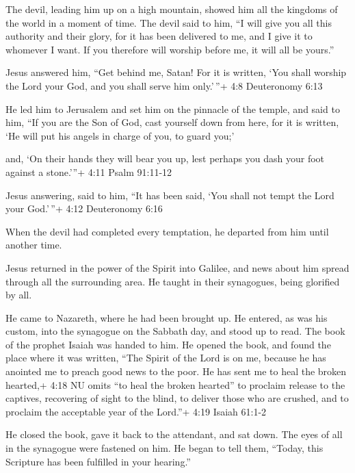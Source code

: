  The devil, leading him up on a high mountain, showed him
all the kingdoms of the world in a moment of time.  The
devil said to him, ``I will give you all this authority and their glory,
for it has been delivered to me, and I give it to whomever I want.
 If you therefore will worship before me, it will all be
yours.''

 Jesus answered him, ``Get behind me, Satan! For it is
written, `You shall worship the Lord your God, and you shall serve him
only.'\,''+ 4:8 Deuteronomy 6:13

 He led him to Jerusalem and set him on the pinnacle of the
temple, and said to him, ``If you are the Son of God, cast yourself down
from here,  for it is written, `He will put his angels in
charge of you, to guard you;'

 and, `On their hands they will bear you up, lest perhaps
you dash your foot against a stone.'''+ 4:11 Psalm 91:11-12

 Jesus answering, said to him, ``It has been said, `You
shall not tempt the Lord your God.'\,''+ 4:12 Deuteronomy 6:16

 When the devil had completed every temptation, he departed
from him until another time.

 Jesus returned in the power of the Spirit into Galilee,
and news about him spread through all the surrounding area.
 He taught in their synagogues, being glorified by all.

 He came to Nazareth, where he had been brought up. He
entered, as was his custom, into the synagogue on the Sabbath day, and
stood up to read.  The book of the prophet Isaiah was
handed to him. He opened the book, and found the place where it was
written,  ``The Spirit of the Lord is on me, because he has
anointed me to preach good news to the poor. He has sent me to heal the
broken hearted,+ 4:18 NU omits ``to heal the broken hearted'' to
proclaim release to the captives, recovering of sight to the blind, to
deliver those who are crushed,  and to proclaim the
acceptable year of the Lord.''+ 4:19 Isaiah 61:1-2

 He closed the book, gave it back to the attendant, and sat
down. The eyes of all in the synagogue were fastened on him.
 He began to tell them, ``Today, this Scripture has been
fulfilled in your hearing.''

